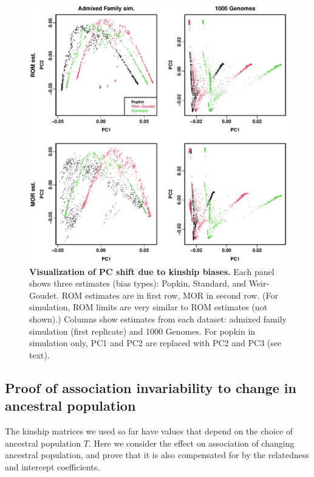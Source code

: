 \documentclass[11pt]{article}
\begin{document}
\begin{figure}[bp!]
  \centering
  \includegraphics[width=\textwidth]{pcs.pdf}
  \caption{
    {\bf Visualization of PC shift due to kinship biases.}
    Each panel shows three estimates (bias types): Popkin, Standard, and Weir-Goudet.
    ROM estimates are in first row, MOR in second row.
    (For simulation, ROM limits are very similar to ROM estimates (not shown).)
    Columns show estimates from each dataset: admixed family simulation (first replicate) and 1000 Genomes.
    For popkin in simulation only, PC1 and PC2 are replaced with PC2 and PC3 (see text).
  }
  \label{fig:pcs}
\end{figure}

\subsection{Proof of association invariability to change in ancestral population}

The kinship matrices we used so far have values that depend on the choice of ancestral population $T$.
Here we consider the effect on association of changing ancestral population, and prove that it is also compensated for by the relatedness and intercept coefficients.
\end{document}
